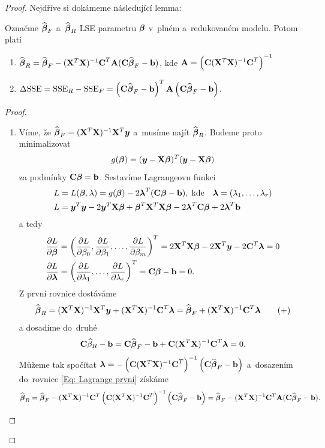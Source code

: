 \begin{proof}

\newcommand{\yb}{\boldsymbol{y}}
\newcommand{\lambdab}{\boldsymbol{\lambda}}
\newcommand{\xtx}{(\X^T \X)^{-1}}
\newcommand{\parcialni}[2]{\frac{\partial #1}{\partial #2}}

Nejdříve si dokámeme následující lemma:
\begin{lemma}
	Označme $\widehat{\boldsymbol{\beta}}_F$ a~$\widehat{\boldsymbol{\beta}}_R$ LSE parametru $\boldsymbol{\beta}$ v~plném a~redukovaném modelu. Potom platí
	\begin{enumerate}
		\item $\widehat{\boldsymbol{\beta}}_R = \widehat{\boldsymbol{\beta}}_F - (\mathbf{X}^T \mathbf{X})^{-1} \textbf{C}^T \textbf{A} (\textbf{C} \widehat{\boldsymbol{\beta}}_F - \mathbf{b})$, kde $\textbf{A} = \left(\textbf{C} (\mathbf{X}^T \mathbf{X})^{-1} \textbf{C}^T \right)^{-1}$
		\item $\Delta \mathrm{SSE} = \mathrm{SSE}_R - \mathrm{SSE}_F = \left(\textbf{C} \widehat{\boldsymbol{\beta}}_F - \mathbf{b} \right)^T \textbf{A} \left(\textbf{C} \widehat{\boldsymbol{\beta}}_F - \mathbf{b} \right)$.
	\end{enumerate}
\end{lemma}

\begin{proof}
\begin{enumerate}
\item
Víme, že $\wbetab_F = \xtx \X^T \yb$ a~musíme najít $\widehat{\boldsymbol{\beta}}_R$. Budeme proto minimalizovat
 $$
g(\betab) = (\yb - \X \betab)^T(\yb - \X \betab)
 $$
za podmínky $\textbf{C} \boldsymbol{\beta} = \mathbf{b}$. Sestavíme Lagrangeovu funkci
\begin{align*}
L & = L(\betab,\lambda) = g(\betab) - 2 \lambdab^T(\Cm \betab - \bb), \; \text{kde} \quad \lambdab = (\lambda_1,\dots, \lambda_r) \\
L & = \yb^T \yb - 2 \yb^T \X \betab + \betab^T \X^T \X \betab - 2 \lambdab^T \Cm \betab + 2 \lambdab^T \bb
\end{align*}
a tedy
\begin{align*}
\frac{\partial L}{\partial \betab} & = \left(\parcialni{L}{\beta_0}, \parcialni{L}{\beta_1},\dots, \parcialni{L}{\beta_m} \right)^T = 2 \X^T \X \betab - 2 \X^T \yb - 2 \Cm^T \lambdab = 0 \\
\parcialni{L}{\lambdab} & = \left(\parcialni{L}{\lambda_1},\dots, \parcialni{L}{\lambda_r} \right)^T = \Cm \betab - \bb = 0.
\end{align*}
Z první rovnice dostáváme
\begin{equation}
\wbetab_R = \xtx \X^T \yb + \xtx \Cm^T \lambdab = \wbetab_F + \xtx \Cm^T \lambdab \tag{+} \label{Eq: Lagrange prvni}
\end{equation}
a dosadíme do~druhé
 $$
\Cm \wbeta_R - \bb = \Cm \wbetab_F - \bb + \Cm \xtx \Cm^T \lambdab = 0.
 $$
Můžeme tak spočítat $\lambdab = -\left(\Cm \xtx \Cm^T\right)^{-1} \left(\Cm \wbetab_F - \bb \right)$ a~dosazením do~rovnice \eqref{Eq: Lagrange prvni} získáme
 $$
\wbetab_R = \wbetab_F - \xtx \Cm^T \left(\Cm \xtx \Cm^T \right)^{-1} \left(\Cm \wbetab_F - \bb \right) = \wbetab_F - \xtx \Cm^T \Am (\Cm \wbetab_F - \bb).
 $$


\end{enumerate}
\end{proof}
\end{proof}

